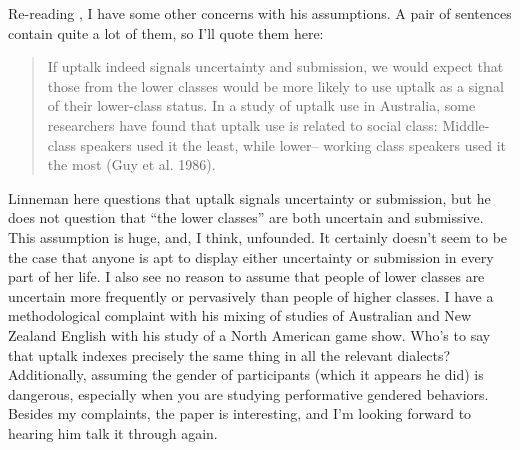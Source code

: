 \documentclass[doc,12pt]{apa6}
\begin{document}
Re-reading , I have some other concerns with his assumptions.
A pair of sentences contain quite a lot of them, so I'll quote them here:
\begin{quote} If uptalk indeed signals uncertainty and submission, we would
	expect that those from the lower classes would be more likely to use
	uptalk as a signal of their lower-class status. In a study of uptalk
	use in Australia, some researchers have found that uptalk use is
	related to social class: Middle-class speakers used it the least, while
lower– working class speakers used it the most (Guy et al. 1986).
\cite[p.~86]{Linneman13} \end{quote} Linneman here questions that uptalk
signals uncertainty or submission, but he does not question that ``the lower
classes'' are both uncertain and submissive.  This assumption is huge, and, I
think, unfounded. It certainly doesn't seem to be the case that anyone is apt
to display either uncertainty or submission in every part of her life. I also
see no reason to assume that people of lower classes are uncertain more
frequently or pervasively than people of higher classes. I have a
methodological complaint with his mixing of studies of Australian and New
Zealand English with his study of a North American game show. 
Who's to say that uptalk indexes precisely the same thing in all the relevant
dialects? Additionally, assuming the gender of participants (which it appears
he did) is dangerous, especially when you are studying performative gendered
behaviors. Besides my complaints, the paper is interesting, and I'm looking
forward to hearing him talk it through again.

\clearpage



\end{document}

